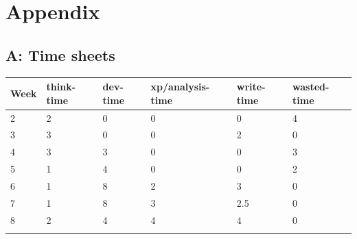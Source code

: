 \section{Appendix}

\subsection{A: Time sheets}

\begin{table}[h]
\begin{tabular}{llllll}
\textbf{Week} & \textbf{think-time} & \textbf{dev-time} & \textbf{xp/analysis-time} & \textbf{write-time} & \textbf{wasted-time} \\ \hline
2             & 2                   & 0                 & 0                         & 0                   & 4                    \\
3             & 3                   & 0                 & 0                         & 2                   & 0                    \\
4             & 3                   & 3                 & 0                         & 0                   & 3                    \\
5             & 1                   & 4                 & 0                         & 0                   & 2                    \\
6             & 1                   & 8                 & 2                         & 3                   & 0                    \\
7             & 1                   & 8                 & 3                         & 2.5                 & 0                    \\
8             & 2                   & 4                 & 4                         & 4                   & 0                    \\
              &                     &                   &                           &                     &                     
\end{tabular}
\end{table}

